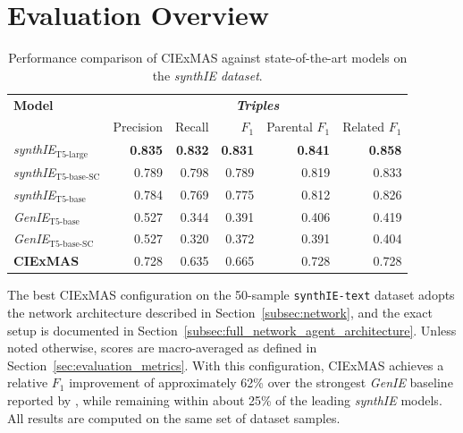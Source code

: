 \documentclass[a4paper,oneside,bibliography=totoc]{scrbook}
\begin{document}
\section{Evaluation Overview}
\label{sec:evaluation_overview}

\begin{table}[h]
  \centering
  \begin{tabular}{l|rrrrr}
    \toprule
    \textbf{Model}                         & \multicolumn{5}{c}{\textit{\textbf{Triples}}}                                                                     \\
                                           & Precision                                     & Recall         & $F_1$          & Parental $F_1$ & Related $F_1$  \\
    \midrule
    \textit{synthIE}$_{\text{T5-large}}$   & \textbf{0.835}                                & \textbf{0.832} & \textbf{0.831} & \textbf{0.841} & \textbf{0.858} \\
    \textit{synthIE}$_{\text{T5-base-SC}}$ & 0.789                                         & 0.798          & 0.789          & 0.819          & 0.833          \\
    \textit{synthIE}$_{\text{T5-base}}$    & 0.784                                         & 0.769          & 0.775          & 0.812          & 0.826          \\
    \textit{GenIE}$_{\text{T5-base}}$      & 0.527                                         & 0.344          & 0.391          & 0.406          & 0.419          \\
    \textit{GenIE}$_{\text{T5-base-SC}}$   & 0.527                                         & 0.320          & 0.372          & 0.391          & 0.404          \\
    \midrule
    \textbf{CIExMAS}                       & 0.728                                         & 0.635          & 0.665          & 0.728          & 0.728          \\
    \bottomrule
  \end{tabular}
  \caption{Performance comparison of CIExMAS against state-of-the-art models on the \textit{synthIE dataset}.}
  \label{tab:evaluation_overview}
\end{table}

The best CIExMAS configuration on the 50-sample \texttt{synthIE-text} dataset adopts the network architecture described in Section~\ref{subsec:network}, and the exact setup is documented in Section~\ref{subsec:full_network_agent_architecture}. Unless noted otherwise, scores are macro-averaged as defined in Section~\ref{sec:evaluation_metrics}. With this configuration, CIExMAS achieves a relative $F_1$ improvement of approximately 62\% over the strongest \textit{GenIE} baseline reported by \citet{Josifoski2021}, while remaining within about 25\% of the leading \textit{synthIE} models. All results are computed on the same set of dataset samples.
\end{document}
